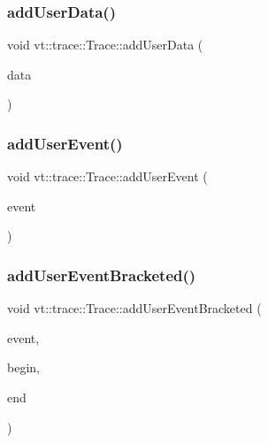 \mbox{\label{structvt_1_1trace_1_1_trace_a7f5ede52aa552c2eac88b894853a2efe}} 
\subsubsection{\texorpdfstring{add\+User\+Data()}{addUserData()}}
{\footnotesize\ttfamily void vt\+::trace\+::\+Trace\+::add\+User\+Data (\begin{DoxyParamCaption}\item[{int32\+\_\+t}]{data }\end{DoxyParamCaption})}

\mbox{\label{structvt_1_1trace_1_1_trace_a0a4bbdf7bd3c2b8742cbceb24389a4c0}} 
\subsubsection{\texorpdfstring{add\+User\+Event()}{addUserEvent()}}
{\footnotesize\ttfamily void vt\+::trace\+::\+Trace\+::add\+User\+Event (\begin{DoxyParamCaption}\item[{\hyperlink{namespacevt_1_1trace_a5908920d051c144c89f17c69ed262350}{User\+Event\+I\+D\+Type}}]{event }\end{DoxyParamCaption})}

\mbox{\label{structvt_1_1trace_1_1_trace_ae57a7ff5517a5bc0694677f10810b545}} 
\subsubsection{\texorpdfstring{add\+User\+Event\+Bracketed()}{addUserEventBracketed()}}
{\footnotesize\ttfamily void vt\+::trace\+::\+Trace\+::add\+User\+Event\+Bracketed (\begin{DoxyParamCaption}\item[{\hyperlink{namespacevt_1_1trace_a5908920d051c144c89f17c69ed262350}{User\+Event\+I\+D\+Type}}]{event,  }\item[{double}]{begin,  }\item[{double}]{end }\end{DoxyParamCaption})}

